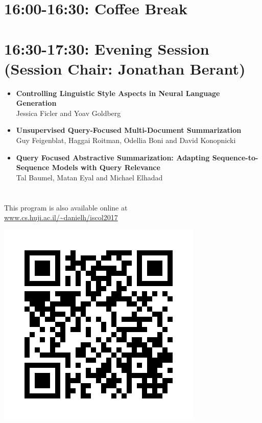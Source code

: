 \documentclass[a0,portrait]{a0poster}
\begin{document}
    \begin{minipage}{.77\textwidth}
        \section*{16:00-16:30: Coffee Break}

        \section*{16:30-17:30: Evening Session (Session Chair: Jonathan Berant)}

        \begin{itemize}
            \item\LARGE
            \textbf{Controlling Linguistic Style Aspects in Neural Language
            Generation}\\
            \Large Jessica Ficler and Yoav Goldberg
            \item\LARGE
            \textbf{Unsupervised Query-Focused Multi-Document Summarization}\\
            \Large Guy Feigenblat, Haggai Roitman, Odellia Boni and David Konopnicki
            \item\LARGE
            \textbf{Query Focused Abstractive Summarization: Adapting
            Sequence-to-Sequence Models with Query Relevance}\\
            \Large Tal Baumel, Matan Eyal and Michael Elhadad
        \end{itemize}
    \end{minipage}
    \hfill
    \begin{minipage}{.2\textwidth}
        \section*{}
        \begin{flushleft}
            This program is also available online at \\
            \small\url{www.cs.huji.ac.il/~danielh/iscol2017}
        \end{flushleft}
        \hfill\includegraphics{qr_code.jpg}
    \end{minipage}
\end{document}
